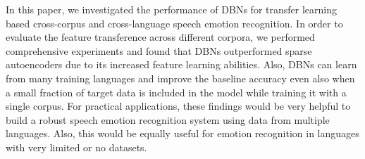 \documentclass[a4paper]{article}
\begin{document}
In this paper, we investigated the performance of DBNs for transfer learning based cross-corpus and cross-language speech emotion recognition. In order to evaluate the feature transference across different corpora, we performed comprehensive experiments and found that DBNs outperformed sparse autoencoders due to its increased feature learning abilities. Also,  DBNs can learn from many training languages and improve the baseline accuracy even also when a small fraction of target data is included in the model while training it with a single corpus. For practical applications, these findings would be very helpful to build a robust speech emotion recognition system using data from multiple languages. Also, this would be equally useful for emotion recognition in languages with very limited or no datasets. 





%

%
\end{document}
